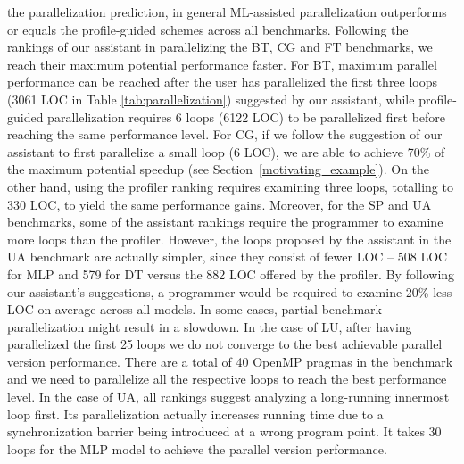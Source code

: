 the parallelization prediction, in general ML-assisted parallelization
outperforms or equals the profile-guided schemes across all benchmarks.\newline\null
\quad Following the rankings of our assistant in parallelizing the BT, CG and FT
benchmarks, we reach their maximum potential performance faster. For BT, maximum
parallel performance can be reached after the user has parallelized the first three loops (3061 LOC in Table \ref{tab:parallelization}) suggested by our assistant, while profile-guided parallelization requires 6 loops (6122 LOC) to be parallelized first before reaching the same performance level. For CG, if we follow the suggestion of our assistant to first parallelize a small loop (6 LOC), we are able to achieve 70\% of the maximum potential speedup (see Section~\ref{motivating_example}). On the other hand, using the profiler ranking requires examining three loops, totalling to 330 LOC, to yield the same performance gains. Moreover, for the SP and UA benchmarks, some of the assistant rankings require the programmer to examine more loops than the profiler. However, the loops proposed by the assistant in the UA benchmark are actually simpler, since they consist of fewer LOC -- 508 LOC for MLP and 579 for DT versus the 882 LOC offered by the profiler. By following our assistant's suggestions, a
programmer would be required to examine 20\% less LOC on average across all models.\newline\null
\quad In some cases, partial benchmark parallelization might result in a slowdown. In the case of LU, after having parallelized the first 25 loops we do not converge to the best achievable parallel version performance. There are a total of 40 OpenMP pragmas in the benchmark and we need to parallelize all the respective loops to reach the best performance level. In the case of UA, all rankings suggest analyzing a long-running innermost loop first. Its parallelization actually increases running time due to a synchronization barrier being introduced at a wrong program point. It takes 30 loops for the MLP model to achieve the parallel version performance.

